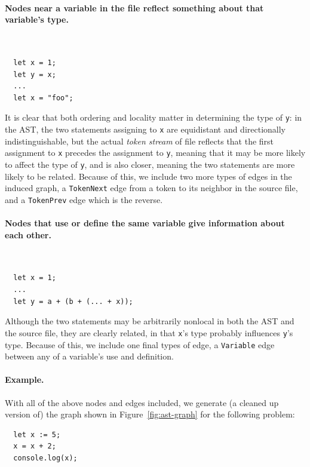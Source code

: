 \par\paragraph{Nodes near a variable in the file reflect something about that variable's type.}
\ %
\begin{lstlisting}
  let x = 1;
  let y = x;
  ...
  let x = "foo";
\end{lstlisting}
It is clear that both ordering and locality matter in determining the type of \texttt{y}: in the AST, the two statements assigning to \texttt{x} are equidistant and directionally indistinguishable, but the actual \emph{token stream} of file reflects that the first assignment to \texttt{x} precedes the assignment to \texttt{y}, meaning that it may be more likely to affect the type of \texttt{y}, and is also closer, meaning the two statements are more likely to be related.
Because of this, we include two more types of edges in the induced graph, a \texttt{TokenNext} edge from a token to its neighbor in the source file, and a \texttt{TokenPrev} edge which is the reverse.

\paragraph{Nodes that use or define the same variable give information about each other.}
\ %
\begin{lstlisting}
  let x = 1;
  ...
  let y = a + (b + (... + x));
\end{lstlisting}
Although the two statements may be arbitrarily nonlocal in both the AST and the source file, they are clearly related, in that \texttt{x}'s type probably influences \texttt{y}'s type.
Because of this, we include one final types of edge, a \texttt{Variable} edge between any of a variable's use and definition.

\paragraph{Example.}
With all of the above nodes and edges included, we generate (a cleaned up version of) the graph shown in Figure~\ref{fig:ast-graph} for the following problem:
\begin{lstlisting}
  let x := 5;
  x = x + 2;
  console.log(x);
\end{lstlisting}

